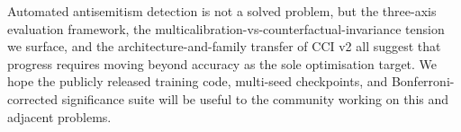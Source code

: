 Automated antisemitism detection is not a solved problem, but the three-axis evaluation framework, the multicalibration-vs-counterfactual-invariance tension we surface, and the architecture-and-family transfer of CCI v2 all suggest that progress requires moving beyond accuracy as the sole optimisation target. We hope the publicly released training code, multi-seed checkpoints, and Bonferroni-corrected significance suite will be useful to the community working on this and adjacent problems.

